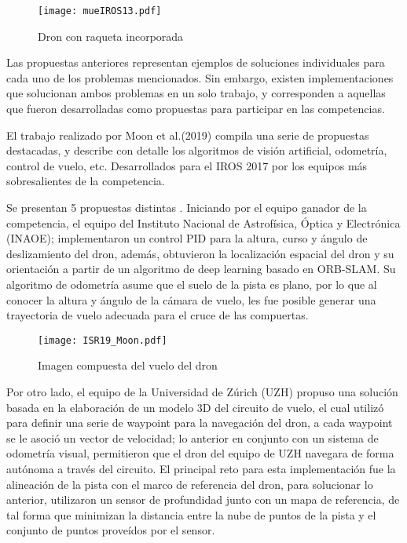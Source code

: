 \begin{figure}[ht]
    \centering
    \texttt{[image: mueIROS13.pdf]}
    \caption{Dron con raqueta incorporada \cite{mueller2013computationally}}
    \label{fig:mueIROS13}
\end{figure}

Las propuestas anteriores representan ejemplos de soluciones individuales para cada uno de los problemas mencionados. Sin embargo, existen implementaciones que solucionan ambos problemas en un solo trabajo, y corresponden a aquellas que fueron desarrolladas como propuestas para participar en las competencias.

El trabajo realizado por Moon et al.(2019) \cite{moon2019challenges} compila una serie de propuestas destacadas, y describe con detalle los algoritmos de visión artificial, odometría, control de vuelo, etc. Desarrollados para el IROS 2017 por los equipos más sobresalientes de la competencia. 

Se presentan 5 propuestas distintas \cite{moon2019challenges}. Iniciando por el equipo ganador de la competencia, el equipo del Instituto Nacional de Astrofísica, Óptica y Electrónica (INAOE); implementaron un control PID para la altura, curso y ángulo de deslizamiento del dron, además, obtuvieron la localización espacial del dron y su orientación a partir de un algoritmo de  deep learning basado en ORB-SLAM. Su algoritmo de odometría asume que el suelo de la pista es plano, por lo que al conocer la altura y ángulo de la cámara de vuelo, les fue posible generar una trayectoria de vuelo adecuada para el cruce de las compuertas. 

\begin{figure}[ht]
    \centering
    \texttt{[image: ISR19\_Moon.pdf]}
    \caption{Imagen compuesta del vuelo del dron  \cite{moon2019challenges}}
    \label{fig:ISR19_Moon}
\end{figure}


Por otro lado, el equipo de la Universidad de Zúrich (UZH) propuso una solución basada en la elaboración de un modelo 3D del circuito de vuelo, el cual utilizó para definir una serie de waypoint para la navegación del dron, a cada waypoint se le asoció un vector de velocidad; lo anterior en conjunto con un sistema de odometría visual, permitieron que el dron del equipo de UZH navegara de forma autónoma a través del circuito. 
El principal reto para esta implementación fue la alineación de la pista con el marco de referencia del dron, para solucionar lo anterior, utilizaron  un sensor de profundidad junto con un mapa de referencia, de tal forma que minimizan la distancia entre la nube de puntos de la pista y el conjunto de puntos proveídos por el sensor.

